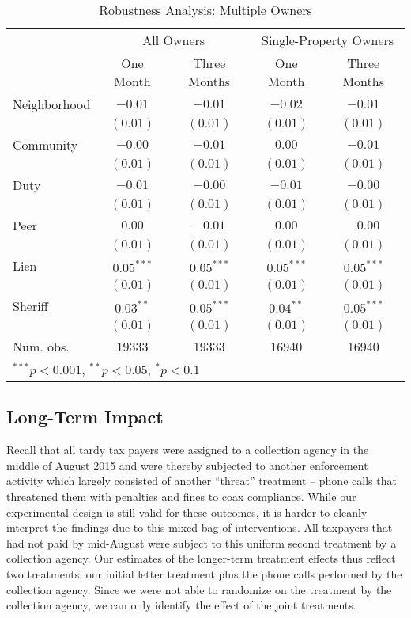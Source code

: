 \documentclass[12pt]{article}
\begin{document}
\begin{table}
\caption{Robustness Analysis: Multiple Owners}
\begin{center}
\begin{tabular}{l c c c c }
\hline
 & \multicolumn{2}{c}{All Owners} & \multicolumn{2}{c}{Single-Property Owners} \\
          & One Month & Three Months & One Month & Three Months \\
\hline
Neighborhood & $-0.01$      & $-0.01$      & $-0.02$      & $-0.01$      \\
          & $(0.01)$     & $(0.01)$     & $(0.01)$     & $(0.01)$     \\
Community     & $-0.00$      & $-0.01$      & $0.00$       & $-0.01$      \\
          & $(0.01)$     & $(0.01)$     & $(0.01)$     & $(0.01)$     \\
Duty      & $-0.01$      & $-0.00$      & $-0.01$      & $-0.00$      \\
          & $(0.01)$     & $(0.01)$     & $(0.01)$     & $(0.01)$     \\
Peer      & $0.00$       & $-0.01$      & $0.00$       & $-0.00$      \\
          & $(0.01)$     & $(0.01)$     & $(0.01)$     & $(0.01)$     \\
Lien      & $0.05^{***}$ & $0.05^{***}$ & $0.05^{***}$ & $0.05^{***}$ \\
          & $(0.01)$     & $(0.01)$     & $(0.01)$     & $(0.01)$     \\
Sheriff   & $0.03^{**}$  & $0.05^{***}$ & $0.04^{**}$  & $0.05^{***}$ \\
          & $(0.01)$     & $(0.01)$     & $(0.01)$     & $(0.01)$     \\
\hline
Num. obs. & 19333        & 19333        & 16940        & 16940        \\
\hline
\multicolumn{5}{l}{\scriptsize{$^{***}p<0.001$, $^{**}p<0.05$, $^*p<0.1$}}
\end{tabular}
\label{sh_lpm_rob}
\end{center}
\end{table}


\subsection{Long-Term Impact}

Recall that all tardy tax payers were assigned to a collection agency
in the middle of August 2015 and were thereby subjected to another
enforcement activity which largely consisted of another ``threat''
treatment -- phone calls that threatened them with penalties and fines
to coax compliance.  While our experimental design is still valid for
these outcomes, it is harder to cleanly interpret the findings due to
this mixed bag of interventions.  All taxpayers that had not paid by
mid-August were subject to this uniform second treatment by a
collection agency.  Our estimates of the longer-term treatment effects
thus reflect two treatments: our initial letter treatment plus the
phone calls performed by the collection agency. Since we were not able
to randomize on the treatment by the collection agency, we can only
identify the effect of the joint treatments.
\end{document}
